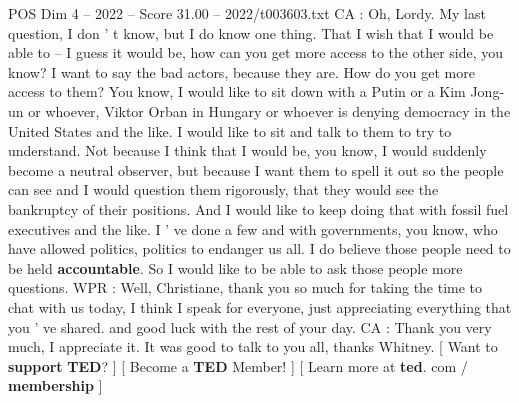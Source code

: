 \begin{textsample}{POS Dim 4 – 2022 – Score 31.00 – 2022/t003603.txt}
CA : Oh, Lordy.
My last question, I don ' t know, but I do know one thing.
That I wish that I would be able to -- I guess it would be, how can you get more access to the other side, you know?
I want to say the bad actors, because they are.
How do you get more access to them?
You know, I would like to sit down with a Putin or a Kim Jong-un or whoever, Viktor Orban in Hungary or whoever is denying democracy in the United States and the like.
I would like to sit and talk to them to try to understand.
Not because I think that I would be, you know, I would suddenly become a neutral observer, but because I want them to spell it out so the people can see and I would question them rigorously, that they would see the bankruptcy of their positions.
And I would like to keep doing that with fossil fuel executives and the like.
I ' ve done a few and with governments, you know, who have allowed politics, politics to endanger us all.
I do believe those people need to be held \textbf{accountable}.
So I would like to be able to ask those people more questions.
WPR : Well, Christiane, thank you so much for taking the time to chat with us today, I think I speak for everyone, just appreciating everything that you ' ve shared. and good luck with the rest of your day.
CA : Thank you very much, I appreciate it.
It was good to talk to you all, thanks Whitney. [ Want to \textbf{support} \textbf{TED}? ] [ Become a \textbf{TED} Member! ] [ Learn more at \textbf{ted}. com / \textbf{membership} ]

\end{textsample}
